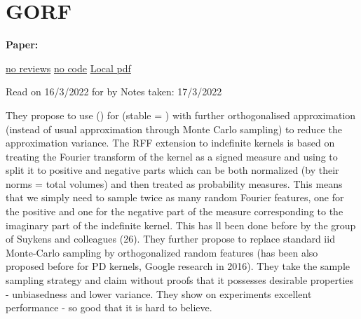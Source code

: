 \clearpage

\section{GORF}\label{sec:gorf}

\begin{notebox}
\textbf{Paper: } 
\vspace{5pt}

\href{}{no reviews}
\hspace{1cm}
\href{}{no code}
\hspace{1cm}
\href{run:/home/magda/Dropbox/Zot//home/magda/Dropbox/Zot/Luo et al_2021_Towards Unbiased Random Features with Lower Variance For Stationary Indefinite.pdf}{Local pdf}
\vspace{3pt}

Read on 16/3/2022 for  by 
\hfill Notes taken: 17/3/2022 
\end{notebox}

\begin{notebox}[colback=red!5]
\tldr They propose to use () for  (stable = ) with further orthogonalised approximation (instead of usual approximation through Monte Carlo sampling) to reduce the approximation variance. The RFF extension to indefinite kernels is based on treating the Fourier transform of the kernel as a signed measure and using  to split it to positive and negative parts which can be both normalized (by their norms = total volumes) and then treated as probability measures. This means that we simply need to sample twice as many random Fourier features, one for the positive and one for the negative part of the measure corresponding to the imaginary part of the indefinite kernel. This has ll been done before by the group of Suykens and colleagues (26).
They further propose to replace standard iid Monte-Carlo sampling by orthogonalized random features (has been also proposed before for PD kernels, Google research in 2016). They take the sample sampling strategy and claim without proofs that it possesses desirable properties - unbiasedness and lower variance. They show on experiments excellent performance - so good that it is hard to believe. 
\end{notebox}

